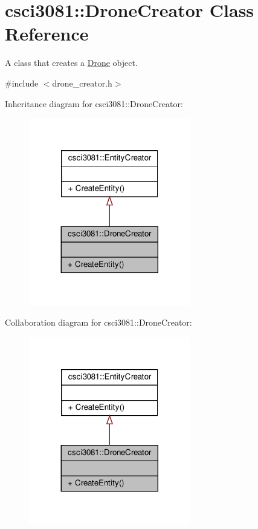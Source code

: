 \hypertarget{classcsci3081_1_1DroneCreator}{}\section{csci3081\+:\+:Drone\+Creator Class Reference}
\label{classcsci3081_1_1DroneCreator}


A class that creates a \hyperlink{classcsci3081_1_1Drone}{Drone} object.  




{\ttfamily \#include $<$drone\+\_\+creator.\+h$>$}



Inheritance diagram for csci3081\+:\+:Drone\+Creator\+:\nopagebreak
\begin{figure}[H]
\begin{center}
\leavevmode
\includegraphics[width=200pt]{classcsci3081_1_1DroneCreator__inherit__graph}
\end{center}
\end{figure}


Collaboration diagram for csci3081\+:\+:Drone\+Creator\+:\nopagebreak
\begin{figure}[H]
\begin{center}
\leavevmode
\includegraphics[width=200pt]{classcsci3081_1_1DroneCreator__coll__graph}
\end{center}
\end{figure}
